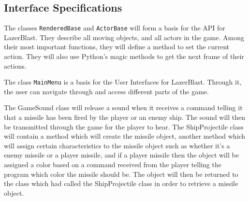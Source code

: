 %
\subsection*{Interface Specifications}
    The classes \texttt{RenderedBase} and
    \texttt{ActorBase} will form a basis for
    the API for LazerBlast.  They describe all moving
    objects, and all actors in the game.  Among their
    most important functions, they will define a method
    to set the current action.  They will also use Python's
    magic methods to get the next frame of their actions.
    
    The class \texttt{MainMenu} is a basis for the User
    Interfaces for LazerBlast. Through it, the user can navigate
    through and access different parts of the game.

    The GameSound class will release a sound when it receives
    a command telling it that a missile has been fired by
    the player or an enemy ship.  The sound will then be transmitted
    through the game for the player to hear.  The ShipProjectile
    class will contain a method which will create the missile
    object, another method which will assign certain characteristics
    to the missile object such as whether it’s a enemy missile or a
    player missile, and if a player missile then the object will be
    assigned a color based on a command received from the player
    telling the program which color the missile should be. The
    object will then be returned to the class which had called the
    ShipProjectile class in order to retrieve a missile object.

